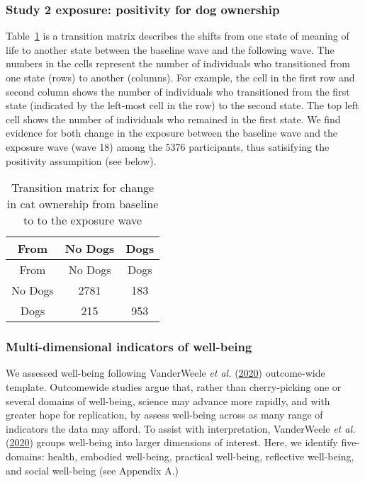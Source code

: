 \documentclass[
  singlecolumn,
  9pt]{article}
\begin{document}
\subsubsection{Study 2 exposure: positivity for dog
ownership}\label{study-2-exposure-positivity-for-dog-ownership}

Table~\ref{tbl-transition-dogs} is a transition matrix describes the
shifts from one state of meaning of life to another state between the
baseline wave and the following wave. The numbers in the cells represent
the number of individuals who transitioned from one state (rows) to
another (columns). For example, the cell in the first row and second
column shows the number of individuals who transitioned from the first
state (indicated by the left-most cell in the row) to the second state.
The top left cell shows the number of individuals who remained in the
first state. We find evidence for both change in the exposure between
the baseline wave and the exposure wave (wave 18) among the 5376
participants, thus satisifying the positivity assumpition (see below).

\hypertarget{tbl-transition-dogs}{}
\begin{longtable}[]{@{}ccc@{}}
\caption{\label{tbl-transition-dogs}Transition matrix for change in cat
ownership from baseline to to the exposure wave}\tabularnewline
\toprule\noalign{}
From & No Dogs & Dogs \\
\midrule\noalign{}
\endfirsthead
\toprule\noalign{}
From & No Dogs & Dogs \\
\midrule\noalign{}
\endhead
\bottomrule\noalign{}
\endlastfoot
No Dogs & 2781 & 183 \\
Dogs & 215 & 953 \\
\end{longtable}

\subsubsection{Multi-dimensional indicators of
well-being}\label{multi-dimensional-indicators-of-well-being}

We assessed well-being following VanderWeele \emph{et al.}
(\hyperref[ref-vanderweele2020]{2020}) outcome-wide template.
Outcomewide studies argue that, rather than cherry-picking one or
several domains of well-being, science may advance more rapidly, and
with greater hope for replication, by assess well-being across as many
range of indicators the data may afford. To assist with interpretation,
VanderWeele \emph{et al.} (\hyperref[ref-vanderweele2020]{2020}) groups
well-being into larger dimensions of interest. Here, we identify
five-domains: health, embodied well-being, practical well-being,
reflective well-being, and social well-being (see Appendix A.)
\end{document}

